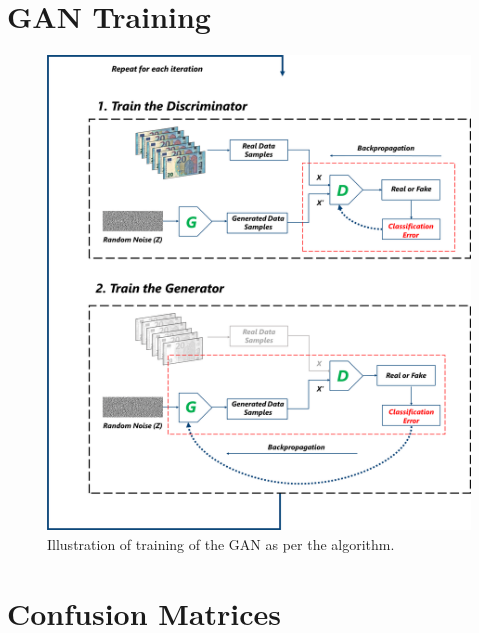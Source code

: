 \newpage
\section{\ac{GAN} Training}
\vspace*{1.5cm}
\begin{figure}[H]
    \begin{center}
	\includegraphics[scale=0.25]{images/Appendix/generatorAndDiscriminatorTraining.png}
	\caption[Illustration of training of the \ac{GAN} as per the algorithm.]{Illustration of training of the \ac{GAN} as per the algorithm.}
	\label{fig:generatorAndDiscriminatorTraining}
	\end{center}
\end{figure}


\section{Confusion Matrices}


